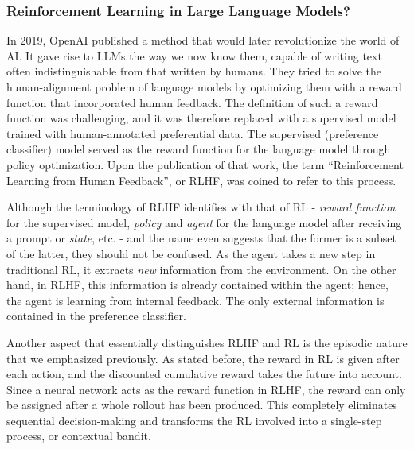 \subsubsection{Reinforcement Learning in Large Language Models?}
In 2019, OpenAI published a method that would later revolutionize the world of AI. It gave rise to LLMs the way we now know them, capable of writing text often indistinguishable from that written by humans. They tried to solve the human-alignment problem of language models by optimizing them with a reward function that incorporated human feedback. The definition of such a reward function was challenging, and it was therefore replaced with a supervised model trained with human-annotated preferential data. The supervised (preference classifier) model served as the reward function for the language model through policy optimization. Upon the publication of that work, the term ``Reinforcement Learning from Human Feedback'', or RLHF, was coined to refer to this process. 

Although the terminology of RLHF identifies with that of RL - \textit{reward function} for the supervised model, \textit{policy} and \textit{agent} for the language model after receiving a prompt or \textit{state}, etc. - and the name even suggests that the former is a subset of the latter, they should not be confused. As the agent takes a new step in traditional RL, it extracts \textit{new} information from the environment. On the other hand, in RLHF, this information is already contained within the agent; hence, the agent is learning from internal feedback. The only external information is contained in the preference classifier.

Another aspect that essentially distinguishes RLHF and RL is the episodic nature that we emphasized previously. As stated before, the reward in RL is given after each action, and the discounted cumulative reward takes the future into account. Since a neural network acts as the reward function in RLHF, the reward can only be assigned after a whole rollout has been produced. This completely eliminates sequential decision-making and transforms the RL involved into a single-step process, or contextual bandit.